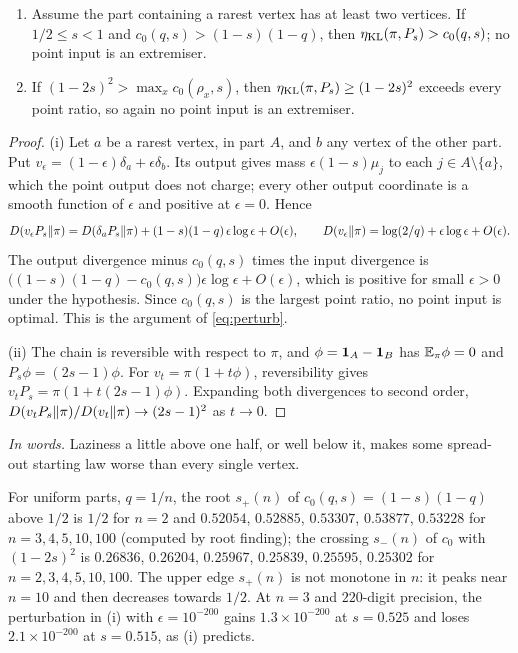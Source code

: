 \begin{proposition}\label{br:prop:edges}
\begin{enumerate}[label=(\roman*)]
\item Assume the part containing a rarest vertex has at least two vertices.
If \(1/2\le s<1\) and \(c_0(q,s)>(1-s)(1-q)\), then
\(\eta_{\mathrm{KL}}(\pi,P_s)>c_0(q,s)\); no point input is an extremiser.
\item If \((1-2s)^2>\max_xc_0(\rho_x,s)\), then
\(\eta_{\mathrm{KL}}(\pi,P_s)\ge(1-2s)^2\) exceeds every point ratio, so again no point
input is an extremiser.
\end{enumerate}
\end{proposition}
\begin{proof}
(i) Let \(a\) be a rarest vertex, in part \(A\), and \(b\) any vertex of the
other part. Put \(v_\epsilon=(1-\epsilon)\delta_a+\epsilon\delta_b\). Its
output gives mass \(\epsilon(1-s)\mu_j\) to each \(j\in A\setminus\{a\}\),
which the point output does not charge; every other output coordinate is a
smooth function of \(\epsilon\) and positive at \(\epsilon=0\). Hence
\[
D(v_\epsilon P_s\|\pi)=D(\delta_aP_s\|\pi)
+(1-s)(1-q)\,\epsilon\log\epsilon+O(\epsilon),\qquad
D(v_\epsilon\|\pi)=\log(2/q)+\epsilon\log\epsilon+O(\epsilon).
\]
The output divergence minus \(c_0(q,s)\) times the input divergence is
\(\big((1-s)(1-q)-c_0(q,s)\big)\epsilon\log\epsilon+O(\epsilon)\), which is
positive for small \(\epsilon>0\) under the hypothesis. Since \(c_0(q,s)\)
is the largest point ratio, no point input is optimal. This is the argument
of \eqref{eq:perturb}.

(ii) The chain is reversible with respect to \(\pi\), and
\(\phi=\mathbf 1_A-\mathbf 1_B\) has \(\mathbb E_\pi\phi=0\) and \(P_s\phi=(2s-1)\phi\).
For \(v_t=\pi(1+t\phi)\), reversibility gives
\(v_tP_s=\pi(1+t(2s-1)\phi)\). Expanding both divergences to second order,
\(D(v_tP_s\|\pi)/D(v_t\|\pi)\to(2s-1)^2\) as \(t\to0\).
\end{proof}

\noindent\textit{In words.} Laziness a little above one half, or well below
it, makes some spread-out starting law worse than every single vertex.

For uniform parts, \(q=1/n\), the root \(s_+(n)\) of
\(c_0(q,s)=(1-s)(1-q)\) above \(1/2\) is \(1/2\) for \(n=2\) and
\(0.52054\), \(0.52885\), \(0.53307\), \(0.53877\), \(0.53228\) for
\(n=3,4,5,10,100\) (computed by root finding); the crossing \(s_-(n)\) of \(c_0\) with \((1-2s)^2\) is
\(0.26836\), \(0.26204\), \(0.25967\), \(0.25839\), \(0.25595\), \(0.25302\)
for \(n=2,3,4,5,10,100\). The upper edge \(s_+(n)\) is not monotone in
\(n\): it peaks near \(n=10\) and then decreases towards \(1/2\).
At \(n=3\) and \(220\)-digit precision, the perturbation in (i) with
\(\epsilon=10^{-200}\) gains \(1.3\times10^{-200}\) at \(s=0.525\) and loses
\(2.1\times10^{-200}\) at \(s=0.515\), as (i) predicts.

